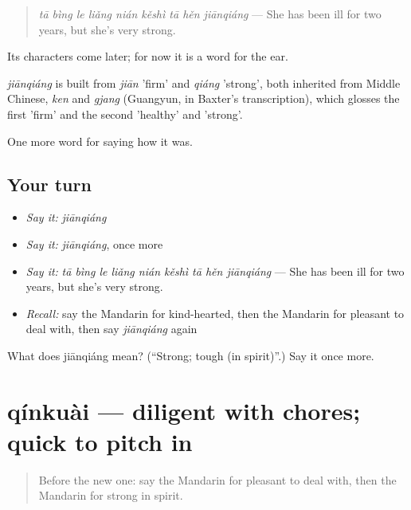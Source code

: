 \begin{quote}
\emph{tā bìng le liǎng nián kěshì tā hěn jiānqiáng} — She has been ill for two years, but she's very strong.
\end{quote}

Its characters come later; for now it is a word for the ear.

\begin{cousinweb}
\emph{jiānqiáng} is built from \emph{jiān} 'firm' and \emph{qiáng} 'strong', both inherited from Middle Chinese, \emph{ken} and \emph{gjang} (Guangyun, in Baxter's transcription), which glosses the first 'firm' and the second 'healthy' and 'strong'.
\end{cousinweb}

\begin{grammarlens}[title={What you've built}]
One more word for saying how it was.
\end{grammarlens}

\subsection*{Your turn}
\begin{itemize}
\raggedright
  \item \emph{Say it:} \emph{jiānqiáng}
  \item \emph{Say it:} \emph{jiānqiáng}, once more
  \item \emph{Say it:} \emph{tā bìng le liǎng nián kěshì tā hěn jiānqiáng} — She has been ill for two years, but she's very strong.
  \item \emph{Recall:} say the Mandarin for kind-hearted, then the Mandarin for pleasant to deal with, then say \emph{jiānqiáng} again
\end{itemize}

\begin{tcolorbox}[breakable,colback=teal!4,colframe=teal!35!black,title={Before you move on}]
What does jiānqiáng mean? (\textquotedblleft{}Strong; tough (in spirit)\textquotedblright{}.) Say it once more.
\end{tcolorbox}
\section[qínkuài]{qínkuài — diligent with chores; quick to pitch in}

\label{lesson:ZH-C468-qinkuai}



\begin{quote}
Before the new one: say the Mandarin for pleasant to deal with, then the Mandarin for strong in spirit.
\end{quote}

